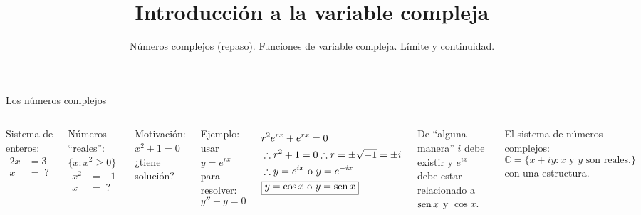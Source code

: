 \documentclass[9pt, aspectratio=169]{beamer}
\title{Introducción a la variable compleja}
\subtitle{Números complejos (repaso). Funciones de variable compleja. Límite y continuidad.}
\begin{document}
\maketitle


\begin{frame}{Los números complejos}
 \begin{columns}[t]
  Sistema de enteros:
  \begin{align*}
  2 x &= 3 \\
  x &= \;?
  \end{align*}
  
  Números ``reales'': $\{ x: x^2 \geq 0\}$
  \begin{align*}
   x^2 &= -1 \\
   x &= \;?
  \end{align*}
  
  Motivación: $ x^2 + 1 = 0 $ ¿tiene solución?
  
  Ejemplo: usar $y = e^{rx}$ para resolver:
  \[  y'' + y = 0 \]
  
  \begin{align*}
   & r^2 e^{rx} + e^{rx} = 0 \\
   & \therefore r^2 + 1 = 0 \therefore r = \pm \sqrt{-1} = \pm i \\
   & \therefore y = e^{ix} \text{ o } y = e^{-ix} \\
   & \boxed{y = \cos x \text{ o } y = \operatorname{sen} x}
  \end{align*}
  
  De ``alguna manera'' $i$ debe existir y $e^{ix}$ debe estar relacionado a $\operatorname{sen} x$ y $\cos x$.
  
  El sistema de \alert{números complejos}:
  \[ \mathbb{C} = \{ x + i y : x \text{ y } y \text{ son reales.} \} \]
  con una estructura.
  

\end{columns}
\end{frame}
\end{document}
